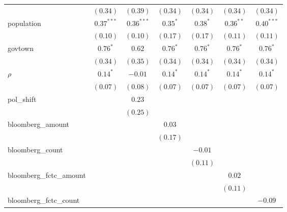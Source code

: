 \begin{table}[!h]
\begin{center}
\begin{tabular}{l c c c c c c }
                        & $(0.34)$      & $(0.39)$      & $(0.34)$      & $(0.34)$      & $(0.34)$      & $(0.34)$      \\
population              & $0.37^{***}$  & $0.36^{***}$  & $0.35^{*}$    & $0.38^{*}$    & $0.36^{**}$   & $0.40^{***}$  \\
                        & $(0.10)$      & $(0.10)$      & $(0.17)$      & $(0.17)$      & $(0.11)$      & $(0.11)$      \\
govtown                 & $0.76^{*}$    & $0.62$        & $0.76^{*}$    & $0.76^{*}$    & $0.76^{*}$    & $0.76^{*}$    \\
                        & $(0.34)$      & $(0.35)$      & $(0.34)$      & $(0.34)$      & $(0.34)$      & $(0.34)$      \\
$\rho$                  & $0.14^{*}$    & $-0.01$       & $0.14^{*}$    & $0.14^{*}$    & $0.14^{*}$    & $0.14^{*}$    \\
                        & $(0.07)$      & $(0.08)$      & $(0.07)$      & $(0.07)$      & $(0.07)$      & $(0.07)$      \\
pol\_shift              &               & $0.23$        &               &               &               &               \\
                        &               & $(0.25)$      &               &               &               &               \\
bloomberg\_amount       &               &               & $0.03$        &               &               &               \\
                        &               &               & $(0.17)$      &               &               &               \\
bloomberg\_count        &               &               &               & $-0.01$       &               &               \\
                        &               &               &               & $(0.11)$      &               &               \\
bloomberg\_fctc\_amount &               &               &               &               & $0.02$        &               \\
                        &               &               &               &               & $(0.11)$      &               \\
bloomberg\_fctc\_count  &               &               &               &               &               & $-0.09$       \\

\end{tabular}
\end{center}
\end{table}
